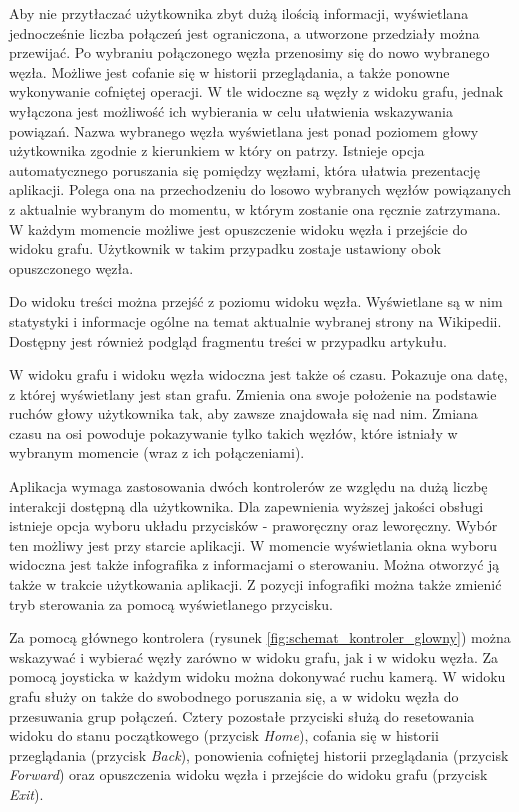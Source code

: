 Aby nie przytłaczać użytkownika zbyt dużą ilością informacji, wyświetlana jednocześnie liczba połączeń jest ograniczona, a utworzone przedziały można przewijać. Po wybraniu połączonego węzła przenosimy się do nowo wybranego węzła. Możliwe jest cofanie się w historii przeglądania, a także ponowne wykonywanie cofniętej operacji. W tle widoczne są węzły z widoku grafu, jednak wyłączona jest możliwość ich wybierania w celu ułatwienia wskazywania powiązań. Nazwa wybranego węzła wyświetlana jest ponad poziomem głowy użytkownika zgodnie z kierunkiem w który on patrzy. Istnieje opcja automatycznego poruszania się pomiędzy węzłami, która ułatwia prezentację aplikacji. Polega ona na przechodzeniu do losowo wybranych węzłów powiązanych z aktualnie wybranym do momentu, w którym zostanie ona ręcznie zatrzymana. W każdym momencie możliwe jest opuszczenie widoku węzła i przejście do widoku grafu. Użytkownik w takim przypadku zostaje ustawiony obok opuszczonego węzła. 

Do widoku treści można przejść z poziomu widoku węzła. Wyświetlane są w nim statystyki i informacje ogólne na temat aktualnie wybranej strony na Wikipedii. Dostępny jest również podgląd fragmentu treści w przypadku artykułu.

W widoku grafu i widoku węzła widoczna jest także oś czasu. Pokazuje ona datę, z której wyświetlany jest stan grafu. Zmienia ona swoje położenie na podstawie ruchów głowy użytkownika tak, aby zawsze znajdowała się nad nim. Zmiana czasu na osi powoduje pokazywanie tylko takich węzłów, które istniały w wybranym momencie (wraz z ich połączeniami).

Aplikacja wymaga zastosowania dwóch kontrolerów ze względu na dużą liczbę interakcji dostępną dla użytkownika. Dla zapewnienia wyższej jakości obsługi istnieje opcja wyboru układu przycisków - praworęczny oraz leworęczny. Wybór ten możliwy jest przy starcie aplikacji. W momencie wyświetlania okna wyboru widoczna jest także infografika z informacjami o sterowaniu. Można otworzyć ją także w trakcie użytkowania aplikacji. Z pozycji infografiki można także zmienić tryb sterowania za pomocą wyświetlanego przycisku.

Za pomocą głównego kontrolera (rysunek \ref{fig:schemat_kontroler_glowny}) można wskazywać i wybierać węzły zarówno w widoku grafu, jak i w widoku węzła. Za pomocą joysticka w każdym widoku można dokonywać ruchu kamerą. W widoku grafu służy on także do swobodnego poruszania się, a w widoku węzła do przesuwania grup połączeń. Cztery pozostałe przyciski służą do resetowania widoku do stanu początkowego (przycisk \textit{Home}), cofania się w historii przeglądania (przycisk \textit{Back}), ponowienia cofniętej historii przeglądania (przycisk \textit{Forward}) oraz opuszczenia widoku węzła i przejście do widoku grafu (przycisk \textit{Exit}).

